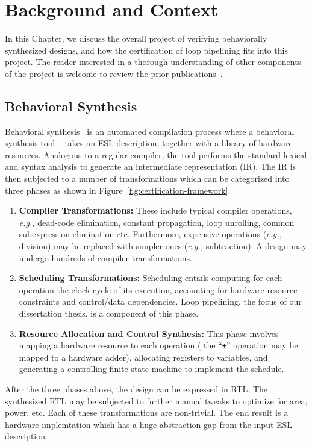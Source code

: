 \chapter{Background and Context}
\label{sec:background}

In this Chapter, we discuss the overall project of verifying behaviorally synthesized
designs, and how the certification of loop pipelining fits into
this project.  The reader interested in a thorough understanding of other
components of the project is welcome to review the prior
publications~\cite{rhcxy:atva-09,hxry:date-10}.

\section{Behavioral Synthesis}

Behavioral synthesis~\cite{lin:survey-97} is an automated compilation process where a behavioral synthesis tool ~\cite{spark,xpilot,legup}  takes an ESL description, together with a library of hardware resources. Analogous to a regular compiler,
the tool performs the standard lexical and syntax analysis to generate an intermediate representation (IR). The IR is then subjected to a number of
transformations which can be categorized into three phases as shown in Figure~\ref{fig:certification-framework}.

 \begin{enumerate}[--]
\item {\bf Compiler Transformations:} These include typical
  compiler operations, {\em e.g.,} dead-code elimination,
  constant propagation, loop unrolling, common subexpression elimination etc.  Furthermore, expensive operations ({\em e.g.,} division) may be replaced with simpler ones ({\em e.g.,} subtraction). A design may
  undergo hundreds of compiler transformations.
\item {\bf Scheduling Transformations:} Scheduling entails
  computing for each operation the clock cycle of its
  execution, accounting for hardware resource constraints
  and control/data dependencies.  Loop pipelining, the focus of our
  dissertation thesis, is a component of this phase.
\item {\bf Resource Allocation and Control Synthesis:} This phase
  involves mapping a hardware resource to each operation (%
the
  ``{\tt +}'' operation may be mapped to a hardware adder), allocating
  registers to variables, and generating a controlling finite-state
  machine to implement the schedule.
\end{enumerate}
After the three phases above, the design can be expressed in
RTL.  The synthesized RTL may be subjected to further manual
tweaks to optimize for area, power, etc. Each of these transformations are non-trivial. The end result is a hardware implemtation which has a huge abstraction gap from the input ESL description. 

